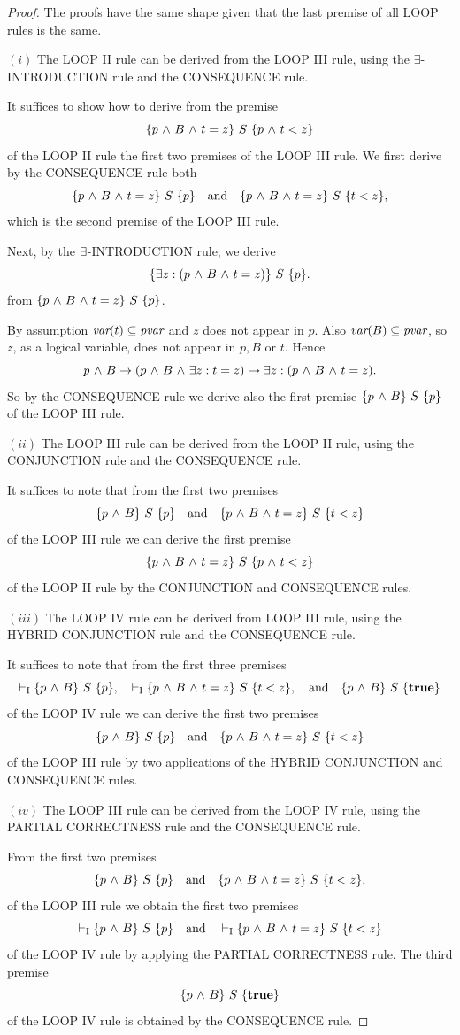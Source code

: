 \documentclass[manuscript, screen, review]{acmart}
\begin{document}
\begin{proof}
The proofs have the same shape given that the last premise of all LOOP rules is the same.
  
\NI
$(i)$ The {\rm LOOP II} rule can be derived from the {\rm LOOP III} rule, using
   the  $\exists$-{\rm INTRODUCTION} rule and the {\rm CONSEQUENCE} rule.
   

It suffices to show how to derive from the premise
\[
  \mbox{$\{{p \mbox{$\ \wedge\ $} B \mbox{$\ \wedge\ $} t=z}\}\ {S}\ \{{p \mbox{$\ \wedge\ $} t<z}\}$}
\]
of the LOOP II rule the first two premises of the LOOP III rule.  We
first derive by the CONSEQUENCE rule both
\[
 \mbox{$\{{p \mbox{$\ \wedge\ $} B \mbox{$\ \wedge\ $} t=z}\}\ {S}\ \{{p}\}$} \quad \mbox{\rm and} \quad
\mbox{$\{{p \mbox{$\ \wedge\ $} B \mbox{$\ \wedge\ $} t=z}\}\ {S}\ \{{t<z}\}$},
\]
which is the second premise of the LOOP III rule.

Next, by the $\mbox{$\exists$}$-INTRODUCTION rule, we derive 
\[
 \mbox{$\{{\mbox{$\exists$} z: (p \mbox{$\ \wedge\ $} B \mbox{$\ \wedge\ $} t=z)}\}\ {S}\ \{{p}\}$}.
\]
from
$\mbox{$\{{p \mbox{$\ \wedge\ $} B \mbox{$\ \wedge\ $} t=z}\}\ {S}\ \{{p}\}$}$.

By assumption $\mbox{\it var}(t)\subseteq \mbox{\it pvar}$ and $z$ does not appear in $p$. Also
$\mbox{\it var}(B)\subseteq \mbox{\it pvar}$, so
$z$, as a logical variable, does not appear
in $p, B$ or $t$. Hence
\[
  p \mbox{$\ \wedge\ $} B \to (p \mbox{$\ \wedge\ $} B \mbox{$\ \wedge\ $} \mbox{$\exists$} z: t=z) \to  \mbox{$\exists$} z: (p \mbox{$\ \wedge\ $} B \mbox{$\ \wedge\ $} t=z).
\]
So by the CONSEQUENCE rule we derive also the first premise
$\mbox{$\{{p \mbox{$\ \wedge\ $} B}\}\ {S}\ \{{p}\}$}$ of the LOOP III rule.
\III

\NI
$(ii)$ The {\rm LOOP III} rule can be derived from the {\rm LOOP II} rule, using
   the {\rm CONJUNCTION} rule and the {\rm CONSEQUENCE} rule.
   
It suffices to note that from the first two premises 
\[
  \mbox{$\{{p \mbox{$\ \wedge\ $} B}\}\ {S}\ \{{p}\}$}\quad \mbox{\rm and} \quad
   \mbox{$\{{p \mbox{$\ \wedge\ $} B \mbox{$\ \wedge\ $} t=z}\}\ {S}\ \{{t<z}\}$}
\]
of the LOOP III rule we can derive the first premise
\[
  \mbox{$\{{p \mbox{$\ \wedge\ $} B \mbox{$\ \wedge\ $} t=z}\}\ {S}\ \{{p \mbox{$\ \wedge\ $} t<z}\}$}
\]
of the LOOP II rule by the CONJUNCTION and CONSEQUENCE rules.
\III

\NI
$(iii)$ 
The {\rm LOOP IV} rule can be derived from {\rm LOOP III} rule, using
the  {\rm HYBRID CONJUNCTION} rule and the {\rm CONSEQUENCE} rule.

It suffices to note that from the first three premises 
\[
  \vdash_{\rm{I}}  \mbox{$\{{p \mbox{$\ \wedge\ $} B}\}\ {S}\ \{{p}\}$},\quad
  \vdash_{\rm{I}}  \mbox{$\{{p \mbox{$\ \wedge\ $} B \mbox{$\ \wedge\ $} t=z}\}\ {S}\ \{{t<z}\}$},\quad
\mbox{\rm and} \quad
 \mbox{$\{{p \mbox{$\ \wedge\ $} B}\}\ {S}\ \{{\mathbf{true}}\}$}
\]
of the LOOP IV rule
we can derive the first two premises
\[
  \mbox{$\{{p \mbox{$\ \wedge\ $} B}\}\ {S}\ \{{p}\}$} \quad
  \mbox{\rm and} \quad \mbox{$\{{p \mbox{$\ \wedge\ $} B \mbox{$\ \wedge\ $} t=z}\}\ {S}\ \{{t<z}\}$}
\]
of the LOOP III rule by two applications of the HYBRID CONJUNCTION and
CONSEQUENCE rules.
\III

\NI
$(iv)$
The {\rm LOOP III} rule can be derived from the {\rm LOOP IV} rule, using 
   the {\rm PARTIAL CORRECTNESS} rule and the {\rm CONSEQUENCE} rule.

From the first two premises
\[
  \mbox{$\{{p \mbox{$\ \wedge\ $} B}\}\ {S}\ \{{p}\}$}
\quad
\mbox{\rm and} \quad
   \mbox{$\{{p \mbox{$\ \wedge\ $} B \mbox{$\ \wedge\ $} t=z}\}\ {S}\ \{{t<z}\}$},
\]
of the LOOP III rule
we obtain the first two premises
$$\vdash_{\rm{I}}  \mbox{$\{{p \mbox{$\ \wedge\ $} B}\}\ {S}\ \{{p}\}$}
\quad
\mbox{\rm and} \quad \vdash_{\rm{I}}  \mbox{$\{{p \mbox{$\ \wedge\ $} B \mbox{$\ \wedge\ $} t=z}\}\ {S}\ \{{t<z}\}$}$$
of the LOOP IV rule
by applying the PARTIAL CORRECTNESS rule.
The third premise
\[
  \mbox{$\{{p \mbox{$\ \wedge\ $} B}\}\ {S}\ \{{\mathbf{true}}\}$}
\]
of the LOOP IV rule is obtained by the CONSEQUENCE rule.
\end{proof}
\end{document}
